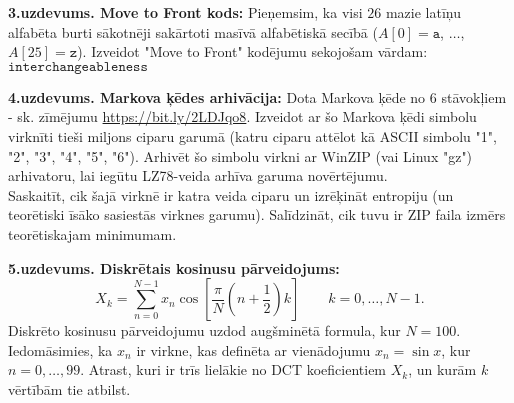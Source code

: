 \documentclass[a4paper,12pt]{article}
\begin{document}
\vspace{6pt}
{\bf 3.uzdevums. Move to Front kods:} Pieņemsim, ka visi $26$ mazie 
latīņu alfabēta burti sākotnēji sakārtoti masīvā alfabētiskā secībā
($A[0]=\mathtt{a}$, $\ldots$, $A[25]=\mathtt{z}$). 
Izveidot "Move to Front" kodējumu sekojošam vārdam: $\mathtt{interchangeableness}$


\vspace{6pt}
{\bf 4.uzdevums. Markova ķēdes arhivācija:} 
Dota Markova ķēde no $6$ stāvokļiem - sk. zīmējumu 
\url{https://bit.ly/2LDJqo8}. 
Izveidot ar šo Markova ķēdi simbolu virknīti tieši miljons ciparu garumā
(katru ciparu attēlot kā ASCII simbolu "1", "2", "3", "4", "5", "6"). 
Arhivēt šo simbolu virkni ar WinZIP (vai Linux "gz") arhivatoru, lai iegūtu 
LZ78-veida arhīva garuma novērtējumu.\\
Saskaitīt, cik šajā virknē ir katra veida ciparu un izrēķināt entropiju (un 
teorētiski īsāko sasiestās virknes garumu). Salīdzināt, cik tuvu ir ZIP 
faila izmērs teorētiskajam minimumam. 


\vspace{6pt}
{\bf 5.uzdevums. Diskrētais kosinusu pārveidojums:} 
$$X_k = \sum_{n=0}^{N-1} x_n \cos \left[\frac{\pi}{N} \left(n+\frac{1}{2}\right) k \right] \quad \quad k = 0, \dots, N-1.$$
Diskrēto kosinusu pārveidojumu uzdod augšminētā formula, kur $N=100$. 
Iedomāsimies, ka $x_n$ ir virkne, kas definēta ar vienādojumu $x_n = \sin x$, kur $n=0,\ldots,99$. 
Atrast, kuri ir trīs lielākie no DCT koeficientiem $X_k$, un kurām $k$ vērtībām tie atbilst.
\end{document}
